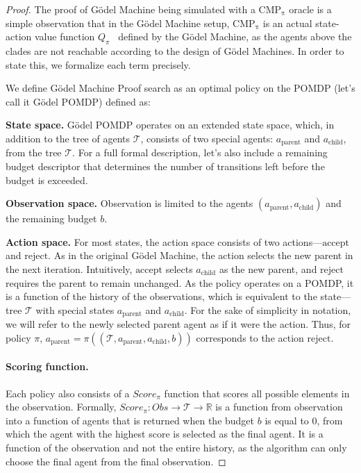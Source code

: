 \documentclass{article} %
\begin{document}
\begin{proof}
The proof of G\"odel Machine being simulated with a $\mathrm{CMP_\pi}$ oracle is a simple observation that in the G\"odel Machine setup, $\mathrm{CMP_\pi}$ is an actual state-action value function $Q_\pi$~\citep{sutton1998reinforcement} defined by the G\"odel Machine, as the agents above the clades are not reachable according to the design of G\"odel Machines. In order to state this, we formalize each term precisely.


We define G\"odel Machine Proof search as an optimal policy on the POMDP (let's call it G\"odel POMDP) defined as:

\textbf{State space. } 
G\"odel POMDP operates on an extended state space, which, in addition to the tree of agents $\mathcal{T}$, consists of two special agents: $a_\text{parent} $ and $ a_\text{child}$, from the tree $\mathcal{T}$. For a full formal description, let's also include a remaining budget descriptor that determines the number of transitions left before the budget is exceeded. 

\textbf{Observation space.}
Observation is limited to the agents $(a_\text{parent}, a_\text{child})$ and the remaining budget $b$.

\textbf{Action space.}
For most states, the action space consists of two actions---$\text{accept}$ and $\text{reject}$. As in the original G\"odel Machine, the action selects the new parent in the next iteration. Intuitively, $\text{accept}$ selects $a_\text{child}$ as the new parent, and $\text{reject}$ requires the parent to remain unchanged. As the policy operates on a POMDP, it is a function of the history of the observations, which is equivalent to the state---tree $\mathcal{T}$ with special states $a_{\text{parent}}$ and $a_{\text{child}}$. For the sake of simplicity in notation, we will refer to the newly selected parent agent as if it were the action. Thus, for policy $\pi$, $a_\text{parent}= \pi((\mathcal{T}, a_\text{parent}, a_\text{child}, b))$ corresponds to the action $\text{reject}$.

\paragraph{Scoring function.}\label{app:indicator} Each policy also consists of a $Score_\pi$ function that scores all possible elements in the observation. Formally, $Score_\pi: Obs \rightarrow \mathcal{T} \rightarrow \mathbb{R}$ is a function from observation into a function of agents that is returned when the budget $b$ is equal to 0, from which the agent with the highest score is selected as the final agent. It is a function of the observation and not the entire history, as the algorithm can only choose the final agent from the final observation.



\end{proof}
\end{document}
